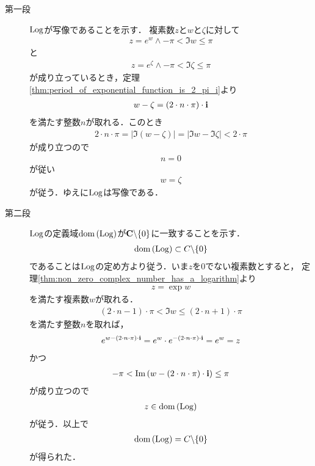 	\begin{sketch}\mbox{}
		\begin{description}
			\item[第一段] $\operatorname{Log}$が写像であることを示す．
				複素数$z$と$w$と$\zeta$に対して
				\begin{align}
					z = e^{w} \wedge -\pi < \Im{w} \leq \pi
				\end{align}
				と
				\begin{align}
					z = e^{\zeta} \wedge -\pi < \Im{\zeta} \leq \pi
				\end{align}
				が成り立っているとき，定理\ref{thm:period_of_exponential_function_is_2_pi_i}より
				\begin{align}
					w - \zeta = (2 \cdot n \cdot \pi) \cdot \mathbf{i}
				\end{align}
				を満たす整数$n$が取れる．このとき
				\begin{align}
					2 \cdot n \cdot \pi = |\Im{(w - \zeta)}| = |\Im{w} - \Im{\zeta}| < 2 \cdot \pi
				\end{align}
				が成り立つので
				\begin{align}
					n = 0
				\end{align}
				が従い
				\begin{align}
					w = \zeta
				\end{align}
				が従う．ゆえに$\operatorname{Log}$は写像である．
				
			\item[第二段] $\operatorname{Log}$の定義域$\operatorname*{dom} \left(\operatorname{Log}\right)$が$\mathbf{C} \backslash \{0\}$に一致することを示す．
				\begin{align}
					\operatorname*{dom} \left(\operatorname{Log}\right) \subset C \backslash \{0\}
				\end{align}
				であることは$\operatorname{Log}$の定め方より従う．いま$z$を$0$でない複素数とすると，
				定理\ref{thm:non_zero_complex_number_has_a_logarithm}より
				\begin{align}
					z = \exp{w}
				\end{align}
				を満たす複素数$w$が取れる．
				\begin{align}
					(2 \cdot n - 1) \cdot \pi < \Im{w} \leq (2 \cdot n+1) \cdot \pi
				\end{align}
				を満たす整数$n$を取れば，
				\begin{align}
					e^{w - (2 \cdot n \cdot \pi) \cdot \mathbf{i}} = e^{w} \cdot e^{- (2 \cdot n \cdot \pi) \cdot \mathbf{i}}
					= e^{w} = z
				\end{align}
				かつ
				\begin{align}
					-\pi < \operatorname{Im} \left(w - (2 \cdot n \cdot \pi) \cdot \mathbf{i}\right) \leq \pi
				\end{align}
				が成り立つので
				\begin{align}
					z \in \operatorname*{dom} \left(\operatorname{Log}\right)
				\end{align}
				が従う．以上で
				\begin{align}
					\operatorname*{dom} \left(\operatorname{Log}\right) = C \backslash \{0\}
				\end{align}
				が得られた．
				\QED
		\end{description}
	\end{sketch}
	
